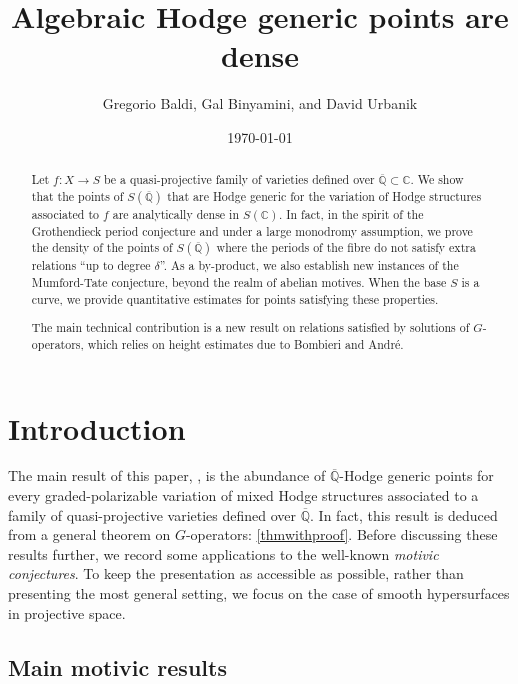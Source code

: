 \documentclass[10pt]{article}
\title{Algebraic Hodge generic points are dense}\date{\today}
\author{Gregorio Baldi, Gal Binyamini, and David Urbanik}
\numberwithin{equation}{section}
\theoremstyle{plain}
\theoremstyle{definition}
\theoremstyle{remark}
\newcommand{\Qbar}{\overline{\mathbb{Q}}}
\begin{document}
\maketitle


\begin{abstract}
Let $f: X \to S$ be a quasi-projective family of varieties defined over $\overline{\mathbb{Q}} \subset \mathbb{C}$. We show that the points of $S(\overline{\mathbb{Q}})$ that are Hodge generic for the variation of Hodge structures associated to $f$ are analytically dense in $S(\mathbb{C})$. In fact, in the spirit of the Grothendieck period conjecture and under a large monodromy assumption, we prove the density of the points of $S(\overline{\mathbb{Q}})$ where the periods of the fibre do not  satisfy extra relations ``up to degree $\delta$''. As a by-product, we also establish new instances of the Mumford-Tate conjecture, beyond the realm of abelian motives. When the base $S$ is a curve, we provide quantitative estimates for points satisfying these properties.


The main technical contribution is a new result on relations satisfied by solutions of $G$-operators, which relies on height estimates due to Bombieri and Andr\'e.
\end{abstract}

\tableofcontents

\section{Introduction}\label{sec1}
The main result of this paper, , is the abundance of $\Qbar$-Hodge generic points for every graded-polarizable variation of mixed Hodge structures associated to a family of quasi-projective varieties defined over $\Qbar$. In fact, this result is deduced from a general theorem on $G$-operators: \autoref{thmwithproof}. Before discussing these results further, we record some applications to the well-known \emph{motivic conjectures}. To keep the presentation as accessible as possible, rather than presenting the most general setting, we focus on the case of smooth hypersurfaces in projective space.

\subsection{Main motivic results}\label{mmr}
\end{document}
